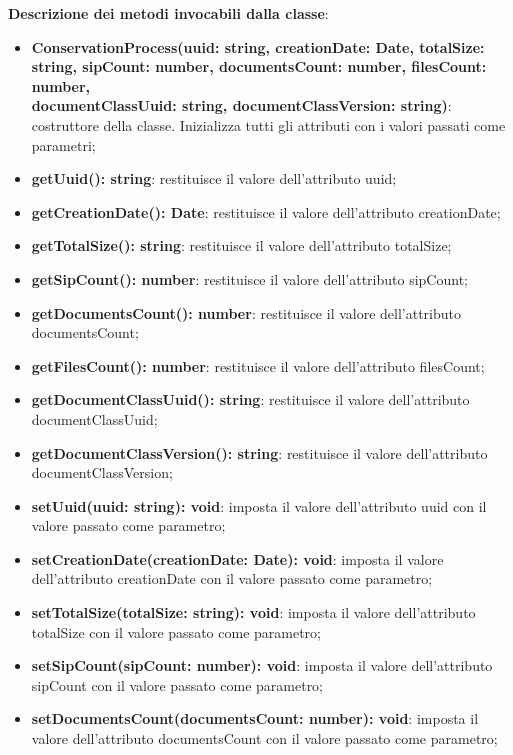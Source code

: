 \documentclass[a4paper,12pt]{article}
\begin{document}
{              \noindent \textbf{Descrizione dei metodi invocabili dalla classe}:
                \begin{itemize}
                    \item \textbf{ConservationProcess(uuid: string, creationDate: Date, totalSize: string, sipCount: number, documentsCount: number, filesCount: number,\\ documentClassUuid: string, documentClassVersion: string)}: costruttore della classe. Inizializza tutti gli attributi con i valori passati come parametri;
                    \item \textbf{getUuid(): string}: restituisce il valore dell'attributo uuid;
                    \item \textbf{getCreationDate(): Date}: restituisce il valore dell'attributo creationDate;
                    \item \textbf{getTotalSize(): string}: restituisce il valore dell'attributo totalSize;
                    \item \textbf{getSipCount(): number}: restituisce il valore dell'attributo sipCount;
                    \item \textbf{getDocumentsCount(): number}: restituisce il valore dell'attributo documentsCount;
                    \item \textbf{getFilesCount(): number}: restituisce il valore dell'attributo filesCount;
                    \item \textbf{getDocumentClassUuid(): string}: restituisce il valore dell'attributo documentClassUuid;
                    \item \textbf{getDocumentClassVersion(): string}: restituisce il valore dell'attributo documentClassVersion;
                    \item \textbf{setUuid(uuid: string): void}: imposta il valore dell'attributo uuid con il valore passato come parametro;
                    \item \textbf{setCreationDate(creationDate: Date): void}: imposta il valore dell'attributo creationDate con il valore passato come parametro;
                    \item \textbf{setTotalSize(totalSize: string): void}: imposta il valore dell'attributo totalSize con il valore passato come parametro;
                    \item \textbf{setSipCount(sipCount: number): void}: imposta il valore dell'attributo sipCount con il valore passato come parametro;
                    \item \textbf{setDocumentsCount(documentsCount: number): void}: imposta il valore dell'attributo documentsCount con il valore passato come parametro;

\end{itemize}}
\end{document}
